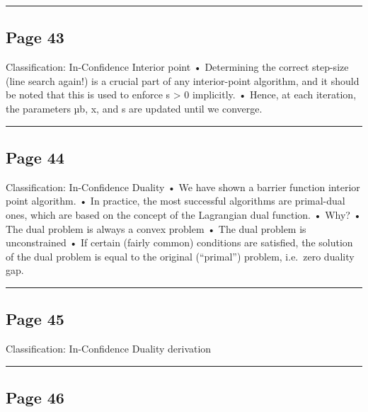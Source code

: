 \documentclass[
]{article}
\begin{document}
\begin{center}\rule{0.5\linewidth}{0.5pt}\end{center}

\subsection{Page 43}\label{page-43}

Classification: In-Confidence Interior point • Determining the correct
step-size (line search again!) is a crucial part of any interior-point
algorithm, and it should be noted that this is used to enforce s
\textgreater{} 0 implicitly. • Hence, at each iteration, the parameters
µb, x, and s are updated until we converge.

\begin{center}\rule{0.5\linewidth}{0.5pt}\end{center}

\subsection{Page 44}\label{page-44}

Classification: In-Confidence Duality • We have shown a barrier function
interior point algorithm. • In practice, the most successful algorithms
are primal-dual ones, which are based on the concept of the Lagrangian
dual function. • Why? • The dual problem is always a convex problem •
The dual problem is unconstrained • If certain (fairly common)
conditions are satisfied, the solution of the dual problem is equal to
the original (``primal'') problem, i.e.~zero duality gap.

\begin{center}\rule{0.5\linewidth}{0.5pt}\end{center}

\subsection{Page 45}\label{page-45}

Classification: In-Confidence Duality derivation

\begin{center}\rule{0.5\linewidth}{0.5pt}\end{center}

\subsection{Page 46}\label{page-46}
\end{document}
